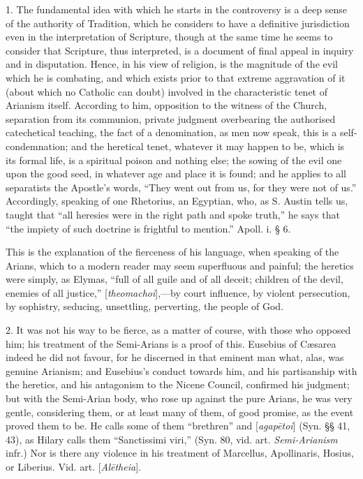 1. The fundamental idea with which he starts in
the controversy is a deep sense of the authority of Tradition, which
he considers to have a definitive jurisdiction even in the
interpretation of Scripture, though at the same time he seems to
consider that Scripture, thus interpreted, is a document of final
appeal in inquiry and in disputation. Hence, in his view of religion,
is the magnitude of the evil which he is combating, and which exists
prior to that extreme aggravation of it (about which no Catholic can
doubt) involved in the characteristic tenet of Arianism itself.
According to him, opposition to the witness of the Church, separation
from its communion, private judgment overbearing the authorised
catechetical teaching, the fact of a denomination, as men now speak,
this is a self-condemnation; and the heretical tenet, whatever it may
happen to be, which is its formal life, is a spiritual poison and
nothing else; the sowing of the evil one upon the good seed, in
whatever age and place it is found; and he applies to all separatists
the Apostle's words, ``They went out from us, for they were not of us.''
Accordingly, speaking of one Rhetorius, an Egyptian, who, as S. Austin
tells us, taught that ``all heresies were in the right path and spoke
truth,'' he says that ``the impiety of such doctrine is frightful to
mention.'' Apoll. i. § 6.

This is the explanation of the fierceness of his
language, when speaking of the Arians, which to a modern reader may
seem superfluous and painful; the heretics were simply, as Elymas, ``full
of all guile and of all deceit; children of the devil, enemies of all
justice,'' [\emph{theomachoi}],—by court influence, by violent
persecution, by sophistry, seducing, unsettling, perverting, the
people of God.

2. It was not his way to be fierce, as a matter
of course, with those who opposed him; his treatment of the
Semi-Arians is a proof of this. Eusebius of Cæsarea indeed he did not
favour, for he discerned in that eminent man what, alas, was genuine
Arianism; and Eusebius's conduct towards him, and his partisanship
with the heretics, and his antagonism to the Nicene Council, confirmed
his judgment; but with the Semi-Arian body, who rose up against the
pure Arians, he was very gentle, considering them, or at least many of
them, of good promise, as the event proved them to be. He calls some
of them ``brethren'' and [\emph{agap\={e}toi}] (Syn. §§ 41, 43), as
Hilary calls them ``Sanctissimi viri,'' (Syn. 80, vid. art. \emph{Semi-Arianism}
infr.) Nor is there any violence in his treatment of Marcellus,
Apollinaris, Hosius, or Liberius. Vid. art. [\emph{Al\={e}theia}].

